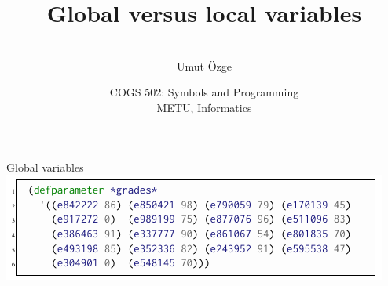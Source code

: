 \documentclass[ignorenonframetext,10pt,aspectratio=169]{beamer}
\title{Global versus local variables}
\author{\  \\ \vspace{20pt} Umut \"Ozge\\  }
\date{COGS 502: Symbols and Programming \\ METU, Informatics}
\begin{document}
\begin{frame}\frametitle{}
\thispagestyle{empty}
\maketitle
\end{frame}

\begin{frame}[t,plain]


\end{frame}

\begin{frame}[t,plain]{Global variables}
\vspace{10pt}
\includegraphics[scale=0.7]{img/defpar.png}

\end{frame}
\end{document}
